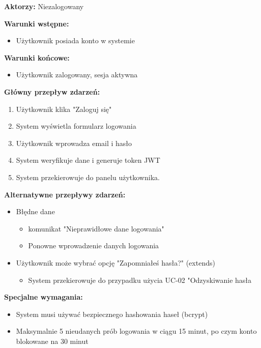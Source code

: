 \documentclass[12pt,a4paper]{article}
\begin{document}
\textbf{Aktorzy:} Niezalogowany

\textbf{Warunki wstępne:}
\begin{itemize}[leftmargin=*]
    \item Użytkownik posiada konto w systemie
\end{itemize}

\textbf{Warunki końcowe:}
\begin{itemize}[leftmargin=*]
    \item Użytkownik zalogowany, sesja aktywna
\end{itemize}

\textbf{Główny przepływ zdarzeń:}
\begin{enumerate}[leftmargin=*]
    \item Użytkownik klika "Zaloguj się"
    \item System wyświetla formularz logowania
    \item Użytkownik wprowadza email i hasło
    \item System weryfikuje dane i generuje token JWT
    \item System przekierowuje do panelu użytkownika.
\end{enumerate}

\textbf{Alternatywne przepływy zdarzeń:}
\begin{itemize}[leftmargin=*]
    \item[5a] Błędne dane
    \begin{itemize}
        \item komunikat "Nieprawidłowe dane logowania"
        \item Ponowne wprowadzenie danych logowania
    \end{itemize}
    \item[5b] Użytkownik może wybrać opcję "Zapomniałeś hasła?" (extends)
    \begin{itemize}
        \item System przekierowuje do przypadku użycia UC-02 "Odzyskiwanie hasła
    \end{itemize}
\end{itemize}

\textbf{Specjalne wymagania:}
\begin{itemize}[leftmargin=*]
    \item System musi używać bezpiecznego hashowania haseł (bcrypt)
    \item Maksymalnie 5 nieudanych prób logowania w ciągu 15 minut, po czym konto blokowane na 30 minut
\end{itemize}
\end{document}
